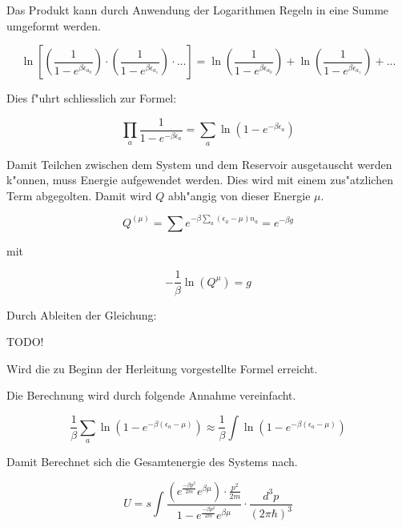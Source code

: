 \begin{refsection}
Das Produkt kann durch Anwendung der Logarithmen Regeln in eine Summe umgeformt werden.

\begin{equation}
\ln \left[ \left( \frac{1}{1-e^{\beta \epsilon_{a_0}}} \right) \cdot \left( \frac{1}{1-e^{ \beta \epsilon_{a_1}}} \right) \cdot ...\right] = \ln \left( \frac{1}{1-e^{\beta \epsilon_{a_0}}} \right) + \ln \left( \frac{1}{1-e^{\beta \epsilon_{a_1}}} \right) + ...
\end{equation}

Dies f"uhrt schliesslich zur Formel:

\begin{equation}
\prod_{a} \frac {1}{1-e^{- \beta \epsilon_a}} = \sum_{a} \ln \left( 1-e^{- \beta \epsilon_a} \right)
\end{equation}

Damit Teilchen zwischen dem System und dem Reservoir ausgetauscht werden k"onnen, muss Energie aufgewendet werden.
Dies wird mit einem zus"atzlichen Term abgegolten. Damit wird $Q$ abh"angig von dieser Energie $\mu$.


 \begin{equation}
 Q^{(\mu)} = \sum e^{- \beta \sum_{a} (\epsilon_a - \mu)n_a} = e^{-\beta g}
 \end{equation}
 
 mit
 
  \begin{equation}
  -\frac{1}{ \beta } \ln(Q^{\mu}) = g
  \end{equation}

Durch Ableiten der Gleichung:

\color{green}TODO!\color{black}

Wird die zu Beginn der Herleitung vorgestellte Formel erreicht.


Die Berechnung wird durch folgende Annahme vereinfacht.

\begin{equation}
\frac{1}{\beta} \sum_{a} \ln(1-e^{-\beta (\epsilon_a -\mu)}) \approx \frac{1}{\beta} \int \ln(1-e^{-\beta (\epsilon_a-\mu)})
\end{equation}

Damit Berechnet sich die Gesamtenergie des Systems nach.

\begin{equation}
U = s \int  \frac{ \left(e^{ {\frac{- \beta p^2}{2m}} } e^{\beta \mu} \right) \cdot {\frac{p^2}{2m}} }{1-e^{ {\frac{- \beta p^2}{2m}} } e^{\beta \mu}} \cdot \frac{d^3 p}{(2 \pi \hbar)^3}
\end{equation}


\end{refsection}
